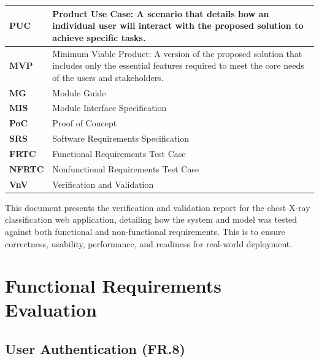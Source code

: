 \documentclass[12pt, titlepage]{article}
\begin{document}
\begin{longtable}[c]{|p{}|p{}|}
  \textbf{PUC} & Product Use Case: A scenario that details how an individual user will interact with the proposed solution to achieve specific tasks. \\ \hline
  \textbf{MVP} & Minimum Viable Product: A version of the proposed solution that includes only the essential features required to meet the core needs of the users and stakeholders. \\ \hline
  \textbf{MG} & Module Guide \\ \hline
  \textbf{MIS} & Module Interface Specification \\ \hline
  \textbf{PoC} & Proof of Concept \\ \hline
  \textbf{SRS} & Software Requirements Specification \\ \hline
  \textbf{FRTC} & Functional Requirements Test Case \\ \hline
  \textbf{NFRTC} & Nonfunctional Requirements Test Case \\ \hline
  \textbf{VnV} & Verification and Validation \\ \hline
\end{longtable}

\newpage

\tableofcontents

\listoftables %

\listoffigures %

\newpage


This document presents the verification and validation report for the chest X-ray classification web application, detailing how the system and model was tested against both functional and non-functional requirements. This is to ensure correctness, usability, performance, and readiness for real-world deployment.


\section{Functional Requirements Evaluation}

\subsection{User Authentication (FR.8)}
\end{document}
